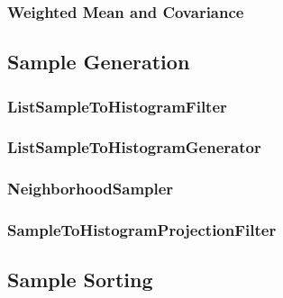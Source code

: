 \ifitkFullVersion 

\fi

\subsubsection{Weighted Mean and Covariance}
\label{sec:WeightedMeanCovariance}

\ifitkFullVersion 

\fi

\subsection{Sample Generation}
\label{sec:SampleGeneration}

\subsubsection{ListSampleToHistogramFilter}
\label{sec:ListSampleToHistogramFilter}

\ifitkFullVersion 

\fi

\subsubsection{ListSampleToHistogramGenerator}
\label{sec:ListSampleToHistogramGenerator}

\ifitkFullVersion 

\fi

\subsubsection{NeighborhoodSampler}
\label{sec:NeighborhoodSampler}

\ifitkFullVersion 

\fi

\subsubsection{SampleToHistogramProjectionFilter}
\label{sec:SampleToHistogramProjectionFilter}

\ifitkFullVersion 

\fi




\subsection{Sample Sorting}
\label{sec:SampleSorting}

\ifitkFullVersion 

\fi

